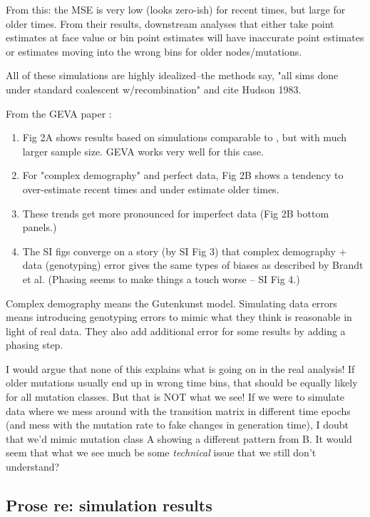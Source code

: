 \documentclass[]{article}
\begin{document}
From this: the MSE is very low (looks zero-ish) for recent times, but large for older times.
From their results, downstream analyses that either take point estimates at face value or bin point estimates 
will have inaccurate point estimates or estimates moving into the wrong bins for older nodes/mutations.

All of these simulations are highly idealized--the methods say,
"all sims done under standard coalescent w/recombination" and cite Hudson 1983.

From the GEVA paper \citep{albers2020dating}:

\begin{enumerate}
    \item Fig 2A shows results based on simulations comparable to \cite{brandt2022evaluation}, but with much larger sample size.
          GEVA works very well for this case.
    \item For "complex demography" and perfect data, Fig 2B shows a tendency to over-estimate recent times and under estimate older times.
    \item These trends get more pronounced for imperfect data (Fig 2B bottom panels.)
    \item The SI figs converge on a story (by SI Fig 3) that complex demography + data (genotyping) error gives the same types of biases as described by Brandt et al.
          (Phasing seems to make things a touch worse -- SI Fig 4.)
\end{enumerate}

Complex demography means the Gutenkunst model.
Simulating data errors means introducing genotyping errors to mimic what they think is reasonable in light of real data.
They also add additional error for some results by adding a phasing step.

I would argue that none of this explains what is going on in the real analysis!
If older mutations usually end up in wrong time bins, that should be equally likely for all mutation classes.
But that is NOT what we see!
If we were to simulate data where we mess around with the transition matrix in different time epochs (and mess with the mutation rate to fake changes in generation time),
I doubt that we'd mimic mutation class A showing a different pattern from B.
It would seem that what we see much be some \textit{technical} issue that we still don't understand?

\subsection*{Prose re: simulation results}
\end{document}
